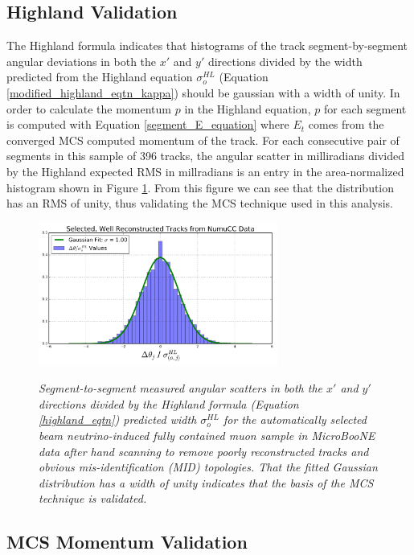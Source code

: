 \documentclass[a4paper,11pt]{article}
\begin{document}
\subsection{Highland Validation}\label{highland_validation_section}
The Highland formula indicates that histograms of the track segment-by-segment angular deviations in both the $x'$ and $y'$ directions divided by the width predicted from the Highland equation $\sigma_o^{HL}$ (Equation \ref{modified_highland_eqtn_kappa}) should be gaussian with a width of unity. In order to calculate the momentum $p$ in the Highland equation, $p$ for each segment is computed with Equation \ref{segment_E_equation} where $E_t$ comes from the converged MCS computed momentum of the track. For each consecutive pair of segments in this sample of 396 tracks, the angular scatter in milliradians divided by the Highland expected RMS in millradians is an entry in the area-normalized histogram shown in Figure \ref{Highland_validation_fig}. From this figure we can see that the distribution has an RMS of unity, thus validating the MCS technique used in this analysis.

\begin{figure}[ht!]
\centering
	\includegraphics[width=0.7\textwidth]{Figures/Highland_validation_DataBNBSelectedRecoTrack_goodscan.png} \\
\caption{\textit{Segment-to-segment measured angular scatters in both the $x'$ and $y'$ directions divided by the Highland formula (Equation \ref{highland_eqtn}) predicted width $\sigma_o^{HL}$ for the automatically selected beam neutrino-induced fully contained muon sample in MicroBooNE data after hand scanning to remove poorly reconstructed tracks and obvious mis-identification (MID) topologies. That the fitted Gaussian distribution has a width of unity indicates that the basis of the MCS technique is validated.}}\label{Highland_validation_fig}
\end{figure}


\subsection{MCS Momentum Validation}\label{MCS_Momentum_Validation_DataRecoTrack_section}
\end{document}
